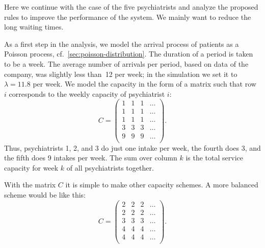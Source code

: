 Here we continue with the case of the five psychiatrists and analyze the proposed rules to improve the performance of the system.
We mainly want to reduce the long waiting times.

As a first step in the analysis, we model the arrival process of patients as a Poisson process, cf.~\cref{sec:poisson-distribution}.
The duration of a period is taken to be a week.
The average number of arrivals per period, based on data of the company, was slightly less than~12 per week; in the simulation we set it to $\lambda= 11.8$ per week.
We model the capacity in the form of a matrix such that row $i$ corresponds to the weekly capacity of psychiatrist $i$:
\begin{equation*}
C = 
 \begin{pmatrix}
 1 & 1 & 1 & \ldots\\
 1 & 1 & 1 & \ldots\\
 1 & 1 & 1 & \ldots\\
 3 & 3 & 3 & \ldots\\
 9 & 9 & 9 & \ldots\\
 \end{pmatrix}.
\end{equation*}
Thus, psychiatrists 1, 2, and 3 do just one intake per week, the
fourth does 3, and the fifth does 9 intakes per week. The sum over
column $k$ is the total service capacity for week $k$ of all
psychiatrists together.

With the matrix $C$ it is simple to make other capacity schemes. A
more balanced scheme would be like this:
\begin{equation*}
C = 
 \begin{pmatrix}
 2 & 2 & 2 & \ldots\\
 2 & 2 & 2 & \ldots\\
 3 & 3 & 3 & \ldots\\
 4 & 4 & 4 & \ldots\\
 4 & 4 & 4 & \ldots\\
 \end{pmatrix}.
\end{equation*}

